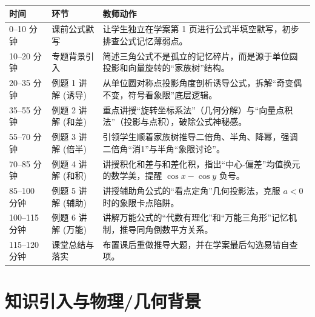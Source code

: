 \documentclass[11pt,a4paper]{ctexart}
\begin{document}
\begin{tabularx}{\textwidth}{p{2.8cm}p{3.2cm}X}
\toprule
时间 & 环节 & 教师动作\\
\midrule
0--10 分钟 & 课前公式默写 & 让学生独立在学案第 1 页进行公式半填空默写，初步排查公式记忆薄弱点。\\ \hline
10--20 分钟 & 专题背景引入 & 简述三角公式不是孤立的记忆碎片，而是源于单位圆投影和向量旋转的“家族树”结构。\\ \hline
20--35 分钟 & 例题 1 讲解 (诱导) & 从单位圆对称点投影角度剖析诱导公式，拆解“奇变偶不变，符号看象限”底层逻辑。\\ \hline
35--55 分钟 & 例题 2 讲解 (和差) & 重点讲授“旋转坐标系法”（几何分解）与“向量点积法”（投影与点积），破除公式神秘感。\\ \hline
55--70 分钟 & 例题 3 讲解 (倍半) & 引领学生顺着家族树推导二倍角、半角、降幂，强调二倍角“消1”与半角“象限讨论”。\\ \hline
70--85 分钟 & 例题 4 讲解 (和积) & 讲授积化和差与和差化积，指出“中心-偏差”均值换元的数学美，提醒 $\cos x - \cos y$ 负号。\\ \hline
85--100 分钟 & 例题 5 讲解 (辅助) & 讲授辅助角公式的“看点定角”几何投影法，克服 $a<0$ 时的象限卡点陷阱。\\ \hline
100--115 分钟 & 例题 6 讲解 (万能) & 讲解万能公式的“代数有理化”和“万能三角形”记忆机制，推导同角倒数平方关系。\\ \hline
115--120 分钟 & 课堂总结与落实 & 布置课后重做推导大题，并在学案最后勾选易错自查项。\\
\bottomrule
\end{tabularx}

\section{知识引入与物理/几何背景}


\end{document}
